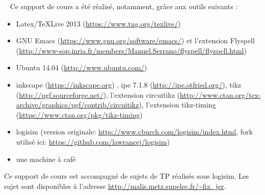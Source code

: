 \mbox{~}
\vfill Ce support de cours a été réalisé, notamment, grâce aux outils suivants :
\begin{itemize}
\item Latex/TeXLive 2013 (\url{https://www.tug.org/texlive/})
\item GNU Emacs (\url{https://www.gnu.org/software/emacs/}) et l'extension Flyspell (\url{http://www-sop.inria.fr/members/Manuel.Serrano/flyspell/flyspell.html})
\item Ubuntu 14.04 (\url{http://www.ubuntu.com/})
\item inkscape (\url{https://inkscape.org}) , ipe 7.1.8 (\url{http://ipe.otfried.org/}), tikz (\url{http://pgf.sourceforge.net/}), l'extension circuitikz (\url{http://www.ctan.org/tex-archive/graphics/pgf/contrib/circuitikz}), l'extension tikz-timing (\url{https://www.ctan.org/pkg/tikz-timing})
\item logisim (version originale: \url{http://www.cburch.com/logisim/index.html}, fork utilisé ici: \url{https://github.com/lawrancej/logisim})
\item une machine à café
\end{itemize}

Ce support de cours est accompagné de sujets de TP réalisés sous logisim. Les sujet sont disponibles à l'adresse \url{http://malis.metz.supelec.fr/~fix_jer}. 
